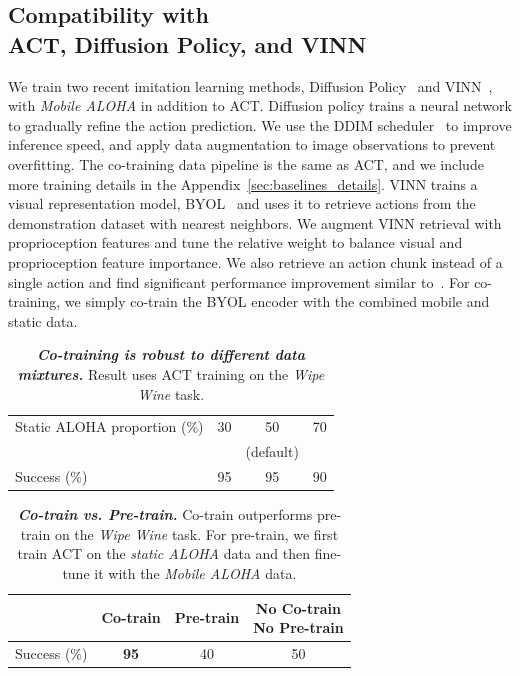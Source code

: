 \documentclass[11pt, a4paper, logo, twocolumn]{stanford}
\newcommand{\method}{\textit{Mobile ALOHA} }
\newcommand{\staticaloha}{\textit{static ALOHA} }
\begin{document}
\subsection{Compatibility with\\ACT, Diffusion Policy, and VINN}
We train two recent imitation learning methods, Diffusion Policy~\cite{chi2023diffusionpolicy} and VINN~\cite{pari2021surprising}, with \method in addition to ACT.
Diffusion policy trains a neural network to gradually refine the action prediction. We use the DDIM scheduler~\cite{song2020denoising} to improve inference speed, and apply data augmentation to image observations to prevent overfitting. The co-training data pipeline is the same as ACT, and we include more training details in the Appendix~\ref{sec:baselines_details}. 
VINN trains a visual representation model, BYOL~\cite{grill2020bootstrap} and uses it to retrieve actions from the demonstration dataset with nearest neighbors. We augment VINN retrieval with proprioception features and tune the relative weight to balance visual and proprioception feature importance. We also retrieve an action chunk instead of a single action and find significant performance improvement similar to~\citeauthor{zhao2023learning}. For co-training, we simply co-train the BYOL encoder with the combined mobile and static data.


\begin{table}[t]
    \centering
    \setlength{\tabcolsep}{6pt}
    \begin{tabular}{lccc}
        \toprule
        \small Static ALOHA proportion (\%) & 30 & 50 & 70 \\
        \small &  & (default) &  \\
        \midrule
        \small Success (\%) & 95 & 95 & 90 \\
        \bottomrule
    \end{tabular}
\caption{\textbf{\textit{Co-training is robust to different data mixtures.}} Result uses ACT training on the \textit{Wipe Wine} task. }
\label{tab:cotrain-mixtures}
\end{table}

\begin{table}[t]
    \centering
    \setlength{\tabcolsep}{4pt}
    \begin{tabular}{lccc}
        \toprule
        \small & Co-train & Pre-train & \thead{No Co-train\\No Pre-train} \\
        \midrule
        \small Success (\%) & \textbf{95} & 40 & 50 \\
        \bottomrule
    \end{tabular}
\caption{\textbf{\textit{Co-train vs. Pre-train.}} Co-train outperforms pre-train on the \textit{Wipe Wine} task. For pre-train, we first train ACT on the \staticaloha data and then fine-tune it with the \method data.}
\label{tab:pretrain}
\end{table}
\end{document}
